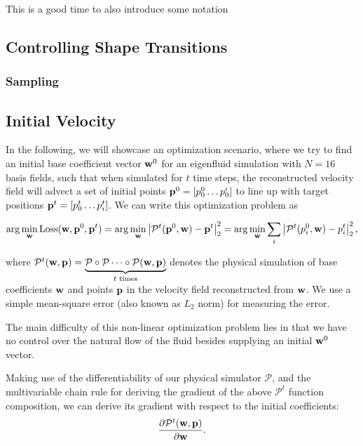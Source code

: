 This is a good time to also introduce some notation 

\subsection{Controlling Shape Transitions}
\label{section:controlling-shape-transitions}

\subsubsection*{Sampling}
\subsection{Initial Velocity}

In the following, we will showcase an optimization scenario, where we try to
find an initial base coefficient vector $\vb{w}^{0}$ for an eigenfluid
simulation with $N=16$ basis fields, such that when simulated for $t$ time
steps, the reconstructed velocity field will advect a set of initial points
$\vb{p}^0 = [p^0_0\dots p^i_0]$ to line up with target positions 
$\vb{p}^{t} = [p^t_0\dots p^t_i]$. We can write this optimization problem as 

$$\arg\min_{\vb{w}} \text{Loss}(\vb{w}, \vb{p}^0, \vb{p}^t)
= \arg\min_{\vb{w}} \left| \mathcal{P}^{t}(\vb{p}^0, \vb{w})
- \vb{p}^t\right|_2^2 = \arg\min_{\vb{w}}
\sum_{i}\left|\mathcal{P}^{t}(p^0_i, \vb{w}) - p^t_i\right|_2^2, $$

where $\mathcal{P}^t(\vb{w}, \vb{p}) = \underbrace{\mathcal{P} \circ
\mathcal{P} \dots \circ \mathcal{P}(\vb{w}, \vb{p})}_{t \text{ times}}$
denotes the physical simulation of base coefficients $\vb{w}$ and 
points $\vb{p}$ in the velocity field reconstructed from $\vb{w}$. We
use a simple mean-square error (also known as $L_2$ norm) for measuring the error.

The main difficulty of this non-linear optimization problem lies in that we have
no control over the natural flow of the fluid besides supplying an initial
$\vb{w}^0$ vector.

Making use of the differentiability of our physical simulator $\mathcal{P}$, and
the multivariable chain rule for deriving the gradient of the above
$\mathcal{P}^t$ function composition, we can derive its gradient with respect to
the initial coefficients:
$$\frac{\partial \mathcal{P}^t(\vb{w},\vb{p})}{\partial \vb{w}}.$$

